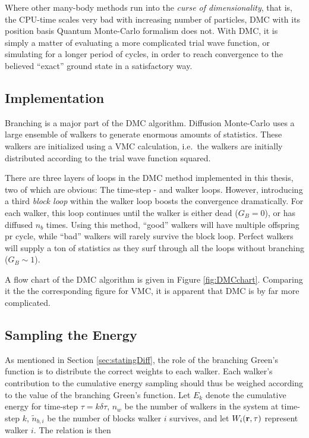 Where other many-body methods run into the \textit{curse of dimensionality}, that is, the CPU-time scales very bad with increasing number of particles, DMC with its position basis Quantum Monte-Carlo formalism does not. With DMC, it is simply a matter of evaluating a more complicated trial wave function, or simulating for a longer period of cycles, in order to reach convergence to the believed ``exact'' ground state in a satisfactory way.

\subsection{Implementation}

Branching is a major part of the DMC algorithm. Diffusion Monte-Carlo uses a large ensemble of walkers to generate enormous amounts of statistics. These walkers are initialized using a VMC calculation, i.e.~the walkers are initially distributed according to the trial wave function squared. 

There are three layers of loops in the DMC method implemented in this thesis, two of which are obvious: The time-step - and walker loops. However, introducing a third \textit{block loop} within the walker loop boosts the convergence dramatically. For each walker, this loop continues until the walker is either dead ($G_B = 0$), or has diffused $n_b$ times. Using this method, ``good'' walkers will have multiple offspring pr cycle, while ``bad'' walkers will rarely survive the block loop. Perfect walkers will supply a ton of statistics as they surf through all the loops without branching ($G_B \sim 1$).

A flow chart of the DMC algorithm is given in Figure \ref{fig:DMCchart}. Comparing it the the corresponding figure for VMC, it is apparent that DMC is by far more complicated. 

\subsection{Sampling the Energy}

As mentioned in Section \ref{sec:statingDiff}, the role of the branching Green's function is to distribute the correct weights to each walker. Each walker's contribution to the cumulative energy sampling should thus be weighed according to the value of the branching Green's function. Let $E_k$ denote the cumulative energy for time-step $\tau = k\delta\tau$, $n_w$ be the number of walkers in the system at time-step $k$, $\tilde n_{b,i}$ be the number of blocks walker $i$ survives, and let $W_i(\mathbf{r}, \tau)$ represent walker $i$. The relation is then

